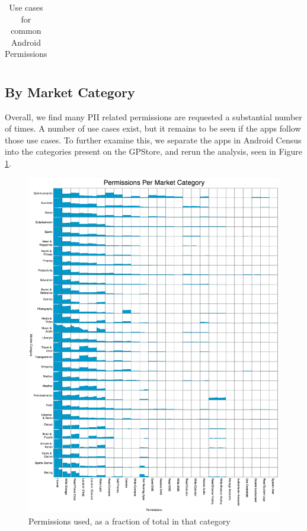 \begin{table}[h]
\begin{small}
\begin{tabular}{p{3cm}|p{12.5cm}}
\end{tabular}
\end{small}
\caption{Use cases for common Android Permissions}
\label{tab:permissionsanduses}
\end{table}

\subsection{By Market Category}
\label{sec:marketcategory}
Overall, we find many PII related permissions are requested a substantial number of times. A number of use cases exist, but it remains to be seen if the apps follow those use cases. To further examine this, we separate the apps in Android Census into the categories present on the GPStore, and rerun the analysis, seen in Figure \ref{fig:permissionspercategory}.

\begin{figure}[h]
\begin{center}
\includegraphics[width=1.0\columnwidth]{figs/PermissionsforMarketCategory}
\caption{Permissions used, as a fraction of total in that category}
\label{fig:permissionspercategory}
\end{center}
\end{figure}

